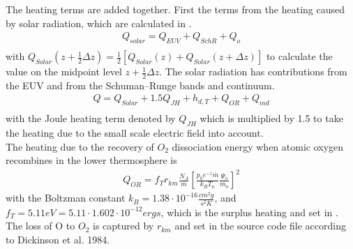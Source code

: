 %
The heating terms are added together. First the terms from the heating caused by
 solar radiation, which are calculated in .
%
\begin{align}
  Q_{solar} = Q_{EUV} + Q_{SchR} + Q_o \\
\end{align}
%
with $Q_{Solar}(z+\frac{1}{2}\Delta z)=
\frac{1}{2}[Q_{Solar}(z)+Q_{Solar}(z+\Delta z)]$ to calculate the
value on the midpoint level $z+\frac{1}{2}\Delta z$. The solar
radiation has contributions from the EUV and from the Schuman--Runge
bands and continuum.
%
\begin{align}
  Q = Q_{Solar} + 1.5 Q_{JH} + h_{d,T} + Q_{OR} + Q_{md}\\
\end{align}
%
with the Joule heating term denoted by $Q_{JH}$ which is multiplied
by 1.5 to take the heating due to the small scale electric field
into account.  \\

%
The heating due to the recovery of $O_2$ dissociation energy when atomic oxygen
recombines in the lower thermosphere is
%
\begin{align}
  Q_{OR} = f_T r_{km} \frac{N_A}{\overline{m}}\left[
   \frac{p_0 e^{-z}\overline{m}}{k_B T_n} \frac{\Psi_o}{m_o}
   \right]^2
\end{align}
%
with the Boltzman constant $k_B = 1.38 \cdot 10^{-16}\frac{cm^2
g}{s^2 K}$, and $f_T = 5.11 eV = 5.11 \cdot 1.602 \cdot 10^{-12}
ergs$, which is the surplus heating and set in .
The loss of O to $O_2$ is captured by
$r_{km}$ and set in the source code file  according to Dickinson et al. 1984.\\

